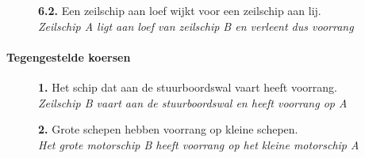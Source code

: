 \vspace{-0.7cm}
\begin{figure}[H]
	\centering
	\hspace{0.02\textwidth}
	\begin{minipage}[t]{0.70\textwidth}
		\textbf{6.2.} Een zeilschip aan loef wijkt voor een zeilschip aan lij.\\
		\textit{Zeilschip A ligt aan loef van zeilschip B en verleent dus voorrang}
	\end{minipage}
	\hfill
	\begin{minipage}[t]{0.20\textwidth}
		\label{pic:kr42}
	\end{minipage}
	\hfill
\end{figure}


\paragraph{Tegengestelde koersen}
\vspace{-0.2cm}
\begin{figure}[H]
	\centering
	\begin{minipage}[t]{0.70\textwidth}
		\textbf{1.} Het schip dat aan de stuurboordswal vaart heeft voorrang.\\
		\textit{Zeilschip B vaart aan de stuurboordswal en heeft voorrang op A}
	\end{minipage}
	\hfill
	\begin{minipage}[t]{0.25\textwidth}
		\label{pic:tg1}
	\end{minipage}
	\hfill
\end{figure}
\vspace{-0.7cm}

\begin{figure}[H]
	\centering
	\begin{minipage}[t]{0.70\textwidth}
		\textbf{2.} Grote schepen hebben voorrang op kleine schepen.\\
		\textit{Het grote motorschip B heeft voorrang op het kleine motorschip A}
	\end{minipage}
	\hfill
	\begin{minipage}[t]{0.25\textwidth}
		\label{pic:tg2}
	\end{minipage}
	\hfill
\end{figure}
\vspace{-0.7cm}

